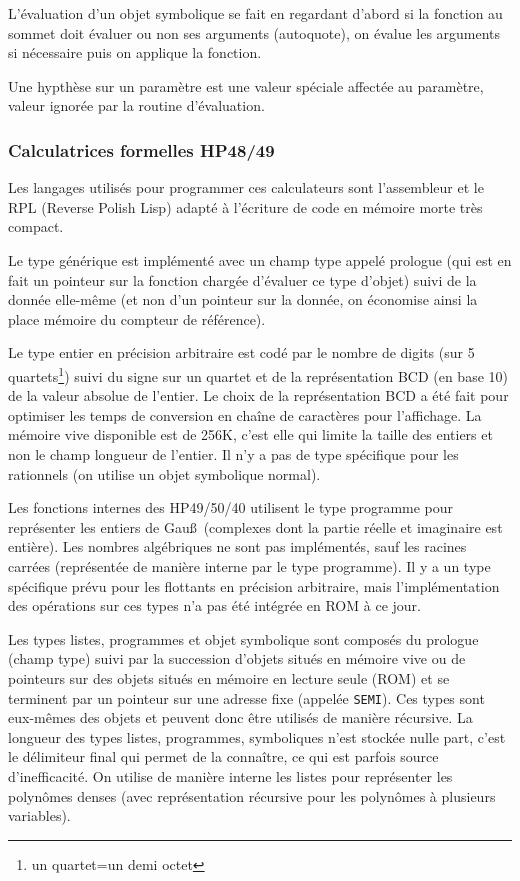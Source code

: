 \documentclass[a4paper,11pt]{article}
\begin{document}
\begin{giacjshere}
L'évaluation d'un objet symbolique se fait en regardant d'abord si
la fonction au sommet doit évaluer ou non ses arguments (autoquote),
on évalue les arguments si nécessaire puis on applique la fonction.

Une hypthèse sur un paramètre est une valeur spéciale
affectée au paramètre, valeur ignorée par la routine d'évaluation.


\subsubsection{Calculatrices formelles HP48/49}
Les langages utilis\'es pour programmer ces calculateurs sont l'assembleur
et le RPL (Reverse Polish Lisp) adapt\'e \`a l'\'ecriture de code
en m\'emoire morte tr\`es compact.

Le type générique est implémenté avec un champ type appelé prologue (qui est
en fait un pointeur sur la fonction chargée d'évaluer ce type d'objet)
suivi de la donnée elle-même (et non d'un pointeur sur la donnée, on
économise ainsi la place mémoire du compteur de référence).

Le type entier en précision arbitraire est codé par le nombre de digits 
(sur 5 quartets\footnote{un quartet=un demi octet}) suivi du signe sur un 
quartet et de la représentation BCD (en base 10) de la valeur absolue de 
l'entier. Le choix de la représentation BCD a été fait pour optimiser 
les temps de conversion en chaîne de caractères pour l'affichage. La mémoire
vive disponible est de 256K, c'est elle qui limite la taille des entiers 
et non le champ longueur de l'entier. Il n'y a pas de type spécifique 
pour les rationnels (on utilise un objet
symbolique normal). 

Les fonctions internes des HP49/50/40 utilisent 
le type programme pour représenter les entiers de Gau\ss\ (complexes
dont la partie réelle et imaginaire est entière).
Les nombres algébriques ne sont pas implémentés, sauf les racines carrées
(représentée de manière interne par le type programme). 
Il y a un type spécifique prévu pour les flottants en précision arbitraire, 
mais l'implémentation des opérations sur ces types
n'a pas été intégrée en ROM à ce jour. 

Les types listes, programmes et objet symbolique sont composés du prologue
(champ type) suivi par la succession d'objets situés en
mémoire vive ou de pointeurs sur des objets situés en mémoire en lecture 
seule (ROM) et se terminent par un pointeur sur une
adresse fixe (appelée \verb|SEMI|). Ces types sont eux-m\^emes des 
objets et peuvent donc \^etre utilis\'es de mani\`ere
r\'ecursive. La longueur des types listes, programmes, symboliques 
n'est stockée nulle part, c'est le délimiteur final
qui permet de la connaître, ce qui est parfois source d'inefficacité.
On utilise de manière interne les listes pour représenter les 
polyn\^omes denses (avec 
représentation récursive pour les polyn\^omes à plusieurs variables). 


\end{giacjshere}
\end{document}
